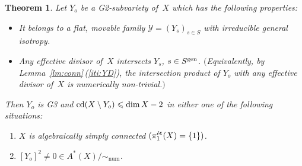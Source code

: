 \documentclass[10pt,a4paper]{article}
\numberwithin{equation}{section}
\newtheorem{m-theorem}{Theorem}[section]
\theoremstyle{definition}
\theoremstyle{remark}
\let\cal\mathcal
\let\les\leqslant
\let\sm\setminus
\newcommand{\cd}{\mathop{\rm cd}\nolimits}
\renewcommand{\dim}{\mathop{\rm dim}\nolimits}
\newcommand{\etl}{{\rm\acute{e}t}}
\newcommand{\gen}{{\rm gen}}
\newcommand{\cY}{{\cal Y}}
\newcommand{\XX}{X}
\newcommand{\YY}{Y}
\newcommand{\num}{\mathrm{num}}
\begin{document}
\begin{m-theorem} \label{thm:g3}
Let $\YY_o$ be a G2-subvariety of\, $\XX$ which has the following properties: 
\begin{itemize}[leftmargin=3ex]
\item It belongs to a flat, movable family $\cY={(\YY_s)}_{s\in S}$ with irreducible general isotropy. 
\item Any effective divisor of\, $\XX$ intersects $Y_s$, $s\in S^\gen$. $($Equivalently, by Lemma~\ref{lm:conn}\,{\rm(\ref{iti:YD})}, the intersection product of $\YY_o$ with any effective divisor of\, $\XX$ is numerically non-trivial.$)$
\end{itemize}
Then $\YY_o$ is G3 and $\cd(\XX\sm\YY_o)\les\dim\XX-2$ in either one of the following situations:
\begin{enumerate}
\item\label{thm:g3-1} $\XX$ is algebraically simply connected $(\pi_1^\etl(\XX)=\{1\})$.
\item\label{thm:g3-2} $[\YY_o]^2\neq0\in A^*(\XX)/\sim_{\num}$.  
\end{enumerate}
\end{m-theorem}
\end{document}
